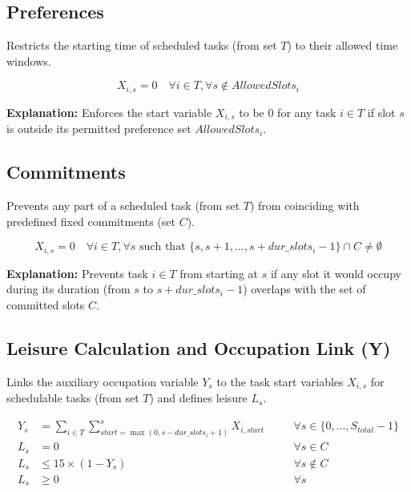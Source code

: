 \documentclass{article}
\begin{document}
\subsection{Preferences}
Restricts the starting time of scheduled tasks (from set $T$) to their allowed time windows.

\[
X_{i,s} = 0 \quad \forall i \in T, \forall s \notin AllowedSlots_i
\]

\textbf{Explanation:} Enforces the start variable $X_{i,s}$ to be 0 for any task $i \in T$ if slot $s$ is outside its permitted preference set $AllowedSlots_i$.

\subsection{Commitments}
Prevents any part of a scheduled task (from set $T$) from coinciding with predefined fixed commitments (set $C$).

\[
X_{i,s} = 0 \quad \forall i \in T, \forall s \text{ such that } \{s, s+1, ..., s + dur\_slots_i - 1\} \cap C \neq \emptyset
\]

\textbf{Explanation:} Prevents task $i \in T$ from starting at $s$ if any slot it would occupy during its duration (from $s$ to $s + dur\_slots_i - 1$) overlaps with the set of committed slots $C$.

\subsection{Leisure Calculation and Occupation Link (Y)}
Links the auxiliary occupation variable $Y_s$ to the task start variables $X_{i,s}$ for schedulable tasks (from set $T$) and defines leisure $L_s$.

\begin{align}
Y_s &= \sum_{i \in T} \sum_{start = \max(0, s - dur\_slots_i + 1)}^{s} X_{i,start} \quad &&\forall s \in \{0, ..., S_{total}-1\} \label{eq:link_y_updated} \\
L_s &= 0 \quad &&\forall s \in C \label{eq:leisure_commit_updated} \\
L_s &\le 15 \times (1 - Y_s) \quad &&\forall s \notin C \label{eq:leisure_task_updated} \\
L_s &\ge 0 \quad &&\forall s \label{eq:leisure_nonneg_updated}
\end{align}
\end{document}
